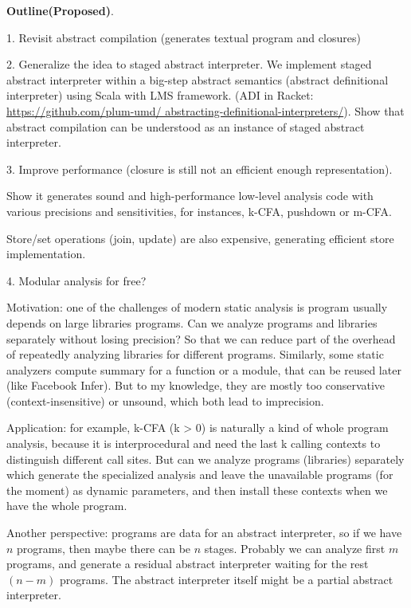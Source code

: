 \documentclass[acmsmall,review,anonymous]{acmart}\settopmatter{printfolios=true,printccs=false,printacmref=false}
\begin{document}
\textbf{Outline(Proposed)}.

1. Revisit abstract compilation (generates textual program and closures) 

2. Generalize the idea to staged abstract interpreter.
We implement staged abstract interpreter within a big-step abstract semantics 
(abstract definitional interpreter) using Scala with LMS framework.
(ADI in Racket: \url{https://github.com/plum-umd/ abstracting-definitional-interpreters/}).
Show that abstract compilation can be understood as an instance of staged 
abstract interpreter.

3. Improve performance (closure is still not an efficient enough representation).

Show it generates sound and high-performance low-level analysis code with 
various precisions and sensitivities, for instances, k-CFA, pushdown or m-CFA. 

Store/set operations (join, update) are also expensive, generating efficient store implementation\cite{liang2014fast}.

4. Modular analysis for free? 

Motivation: one of the challenges of modern static analysis is program usually depends on
large libraries programs\cite{toman_et_al:LIPIcs:2017:7121}. 
Can we analyze programs and libraries separately without losing precision? So that we can 
reduce part of the overhead of repeatedly analyzing libraries for different programs.
Similarly, some static analyzers compute summary for a function or a module, that can be reused
later (like Facebook Infer). But to my knowledge, they are mostly too conservative (context-insensitive) 
or unsound, which both lead to imprecision.

Application: for example, k-CFA (k > 0) is naturally a kind of whole program analysis,
because it is interprocedural and need the last k calling contexts to distinguish
different call sites.
But can we analyze programs (libraries) separately which generate the specialized 
analysis and leave the unavailable programs (for the moment) as dynamic parameters, 
and then install these contexts when we have the whole program.

Another perspective: programs are data for an abstract interpreter, so if we have $n$ programs, 
then maybe there can be $n$ stages. 
Probably we can analyze first $m$ programs, and generate a residual abstract interpreter
waiting for the rest $(n-m)$ programs.
The abstract interpreter itself might be a partial abstract interpreter.
\end{document}
